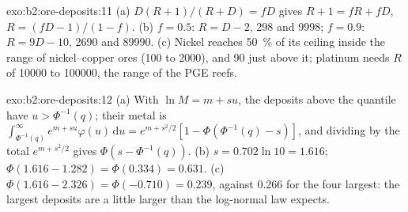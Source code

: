 \begin{solution}{exo:b2:ore-deposits:11}
(a) $D(R + 1)/(R + D) = fD$ gives $R + 1 = fR + fD$, $R = (fD - 1)/(1 - f)$. (b) $f = 0.5$: $R = D - 2$,
298 and \num{9998}; $f = 0.9$: $R = 9D - 10$, \num{2690} and \num{89990}. (c) Nickel reaches
\qty{50}{\percent} of its ceiling inside the range of nickel--copper ores (100 to \num{2000}), and 90 just above it;
platinum needs $R$ of \num{10000} to \num{100000}, the range of the PGE reefs.
\end{solution}

\begin{solution}{exo:b2:ore-deposits:12}
(a) With $\ln M = m + s u$, the deposits above the quantile have $u > \Phi^{-1}(q)$; their metal is
$\int_{\Phi^{-1}(q)}^{\infty} e^{m + su}\varphi(u)\,\mathrm{d}u = e^{m + s^2/2}[1 - \Phi(\Phi^{-1}(q) -
s)]$, and dividing by the total $e^{m + s^2/2}$ gives $\Phi(s - \Phi^{-1}(q))$. (b) $s = 0.702 \ln 10 =
1.616$; $\Phi(1.616 - 1.282) = \Phi(0.334) = 0.631$. (c) $\Phi(1.616 - 2.326) = \Phi(-0.710) = 0.239$,
against 0.266 for the four largest: the largest deposits are a little larger than the log-normal
law expects.
\end{solution}

